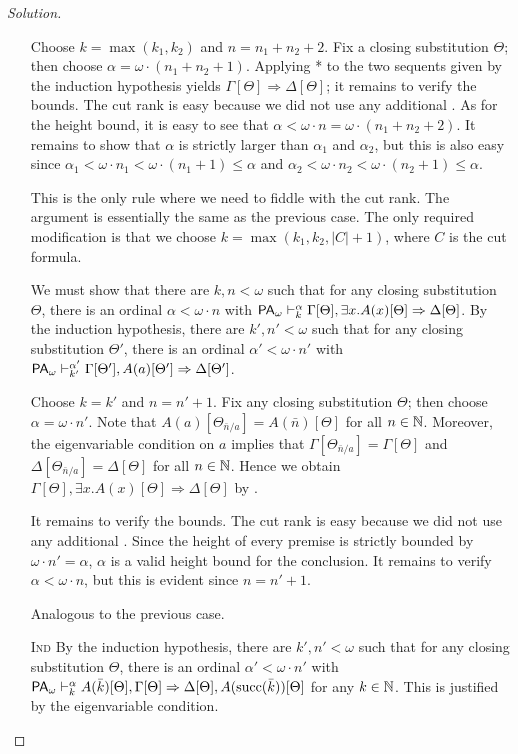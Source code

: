 \documentclass[a4paper]{article}
\begin{document}
\begin{proof}[Solution]
\begin{itemize}
    Choose $k = \max(k_1, k_2)$ and $n = n_1 + n_2 + 2$.
    Fix a closing substitution $\Theta$; then choose $\alpha = \omega \cdot (n_1 + n_2 + 1)$.
    Applying * to the two sequents given by the induction hypothesis yields $\Gamma[\Theta] \Rightarrow \Delta[\Theta]$; it remains to verify the bounds.
    The cut rank is easy because we did not use any additional \rCut.
    As for the height bound, it is easy to see that $\alpha < \omega \cdot n = \omega \cdot (n_1 + n_2 + 2)$.
    It remains to show that $\alpha$ is strictly larger than $\alpha_1$ and $\alpha_2$, but this is also easy since $\alpha_1 < \omega \cdot n_1 < \omega \cdot (n_1 + 1) \leq \alpha$ and $\alpha_2 < \omega \cdot n_2 < \omega \cdot (n_2 + 1) \leq \alpha$.
  \item[\rCut] This is the only rule where we need to fiddle with the cut rank.
    The argument is essentially the same as the previous case.
    The only required modification is that we choose $k = \max(k_1,k_2,|C|+1)$, where $C$ is the cut formula.
  \item[\rLEx] We must show that there are $k,n < \omega$ such that for any closing substitution $\Theta$, there is an ordinal $\alpha < \omega \cdot n$ with $\PAod{\alpha}{k} \Gamma[\Theta], \exists x.A(x)[\Theta] \Rightarrow \Delta[\Theta]$.
    By the induction hypothesis, there are $k',n' < \omega$ such that for any closing substitution $\Theta'$, there is an ordinal $\alpha' < \omega \cdot n'$ with $\PAod{\alpha'}{k'} \Gamma[\Theta'], A(a)[\Theta'] \Rightarrow \Delta[\Theta']$.

    Choose $k = k'$ and $n = n' + 1$.
    Fix any closing substitution $\Theta$; then choose $\alpha = \omega \cdot n'$.
    Note that $A(a)[\Theta_{\bar{n}/a}] = A(\bar{n})[\Theta]$ for all $n \in \NN$.
    Moreover, the eigenvariable condition on $a$ implies that $\Gamma[\Theta_{\bar{n}/a}] = \Gamma[\Theta]$ and $\Delta[\Theta_{\bar{n}/a}] = \Delta[\Theta]$ for all $n \in \NN$.
    Hence we obtain $\Gamma[\Theta],\exists x.A(x)[\Theta] \Rightarrow \Delta[\Theta]$ by \rLo.
    \begin{mathpar}
    \end{mathpar}
    It remains to verify the bounds.
    The cut rank is easy because we did not use any additional \rCut.
    Since the height of every premise is strictly bounded by $\omega \cdot n' = \alpha$, $\alpha$ is a valid height bound for the conclusion.
    It remains to verify $\alpha < \omega \cdot n$, but this is evident since $n = n' + 1$.
  \item[\rRAll] Analogous to the previous case.
  \item[\textsc{Ind}] By the induction hypothesis, there are $k', n' < \omega$ such that for any closing substitution $\Theta$, there is an ordinal $\alpha' < \omega \cdot n'$ with $\PAod{\alpha}{k} A(\bar{k})[\Theta],\Gamma[\Theta] \Rightarrow \Delta[\Theta], A(\text{succ}(\bar{k}))[\Theta]$ for any $k \in \NN$.
    This is justified by the eigenvariable condition.


\end{itemize}
\end{proof}
\end{document}
